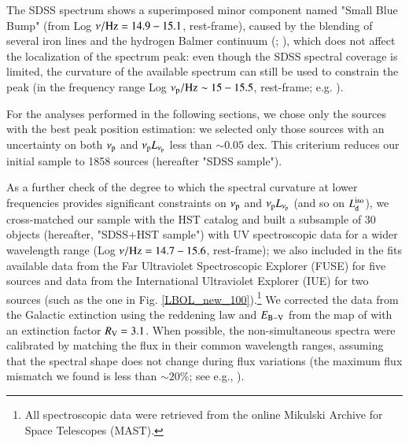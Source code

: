 \documentclass[]{aa}
\begin{document}
The SDSS spectrum shows a superimposed minor component named "Small Blue Bump" (from Log $\nu / {\rm Hz} = 14.9 - 15.1$, rest-frame), caused by the blending of several iron lines and the hydrogen Balmer continuum (\citealt{Wills}; \citealt{Vanden}), which does not affect the localization of the spectrum peak: even though the SDSS spectral coverage is limited, the curvature of the available spectrum can still be used to constrain the peak (in the frequency range Log $\nu_{\rm p} / {\rm Hz} \sim 15 - 15.5$, rest-frame; e.g. \citealt{Campitic}). 

For the analyses performed in the following sections, we chose only the sources with the best peak position estimation: we selected only those sources with an uncertainty on both $\nu_{\rm p}$ and $\nu_{\rm p}L_{\nu_{\rm p}}$ less than $\sim 0.05$ dex. This criterium reduces our initial sample to 1858 sources (hereafter "SDSS sample").

As a further check of the degree to which the spectral curvature at lower frequencies provides significant constraints on $\nu_{\rm p}$ and $\nu_{\rm p}L_{\nu_{\rm p}}$ (and so on $L^{\rm iso}_{\rm d}$), we cross-matched our sample with the HST catalog and built a subsample of 30 objects (hereafter, "SDSS+HST sample") with UV spectroscopic data for a wider wavelength range (Log $\nu / {\rm Hz} = 14.7 - 15.6$, rest-frame); we also included in the fits available data from the Far Ultraviolet Spectroscopic Explorer (FUSE) for five sources and data from the International Ultraviolet Explorer (IUE) for two sources (such as the one in Fig. \ref{LBOL_new_100}).\footnote{All spectroscopic data were retrieved from the online Mikulski Archive for Space Telescopes (MAST).} We corrected the data from the Galactic extinction using the \citet{Cardelli} reddening law and $E_{\rm B-V}$ from the map of \citet{Schle} with an extinction factor $R_{\rm V} = 3.1$. When possible, the non-simultaneous spectra were calibrated by matching the flux in their common wavelength ranges, assuming that the spectral shape does not change during flux variations (the maximum flux mismatch we found is less than $\sim 20 \%$; see e.g., \citealt{Shang05}). 
\end{document}
